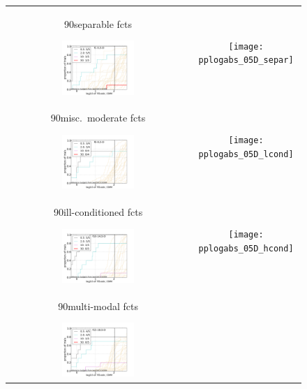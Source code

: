 \documentclass{article}
\newcommand{\rot}[2][2.5]{
  \hspace*{-3.5\baselineskip}%
  \begin{rotate}{90}\hspace{#1em}#2
  \end{rotate}}
\begin{document}
\begin{figure}[htbp!]
\centering
\begin{tabular}{@{}c@{}c@{}}
\rot[2.5]{separable fcts}
\includegraphics[width=0.41\textwidth,trim=0 7.5mm 16mm 11mm, clip]{pprldistr_05D_separ} &
\texttt{[image: pplogabs\_05D\_separ]}
\\[-1ex]
\rot[1.3]{misc.\ moderate fcts}
\includegraphics[width=0.41\textwidth,trim=0 7.5mm 16mm 11mm, clip]{pprldistr_05D_lcond} &
\texttt{[image: pplogabs\_05D\_lcond]}
\\[-1ex]
\rot[1.1]{ill-conditioned fcts}
\includegraphics[width=0.41\textwidth,trim=0 7.5mm 16mm 11mm, clip]{pprldistr_05D_hcond} &
\texttt{[image: pplogabs\_05D\_hcond]}
\\[-1ex]
\rot[1.7]{multi-modal fcts}
\includegraphics[width=0.41\textwidth,trim=0 7.5mm 16mm 11mm, clip]{pprldistr_05D_multi} &

\end{tabular}
\end{figure}
\end{document}
